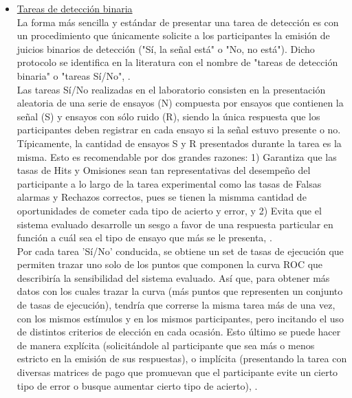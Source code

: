 \begin{itemize}
\item \underline{Tareas de detección binaria}\\

La forma más sencilla y estándar de presentar una tarea de detección es con un procedimiento que únicamente solicite a los participantes la emisión de juicios binarios de detección ("Sí, la señal está" o "No, no está"). Dicho protocolo se identifica en la literatura con el nombre de "tareas de detección binaria" o "tareas Sí/No", \parencite{McNicol2}.\\

Las tareas Sí/No realizadas en el laboratorio consisten en la presentación aleatoria de una serie de ensayos (N) compuesta por ensayos que contienen la señal (S) y ensayos con sólo ruido (R), siendo la única respuesta que los participantes deben registrar en cada ensayo si la señal estuvo presente o no. Típicamente, la cantidad de ensayos S y R presentados durante la tarea es la misma. Esto es recomendable por dos grandes razones: 1) Garantiza que las tasas de Hits y Omisiones sean tan representativas del desempeño del participante a lo largo de la tarea experimental como las tasas de Falsas alarmas y Rechazos correctos, pues se tienen la mismma cantidad de oportunidades de cometer cada tipo de acierto y error, y 2) Evita que el sistema evaluado desarrolle un sesgo a favor de una respuesta particular en función a cuál sea el tipo de ensayo que más se le presenta, \parencite{Wickens}.\\

Por cada tarea 'Sí/No' conducida, se obtiene un set de tasas de ejecución que permiten trazar uno solo de los puntos que componen la curva ROC que describiría la sensibilidad del sistema evaluado. Así que, para obtener más datos con los cuales trazar la curva (más puntos que representen un conjunto de tasas de ejecución), tendría que correrse la misma tarea más de una vez, con los mismos estímulos y en los mismos participantes, pero incitando el uso de distintos criterios de elección en cada ocasión. Esto último se puede hacer de manera explícita (solicitándole al participante que sea más o menos estricto en la emisión de sus respuestas), o implícita (presentando la tarea con diversas matrices de pago que promuevan que el participante evite un cierto tipo de error o busque aumentar cierto tipo de acierto), \parencite{Wickens, McNicol2, Nevin1969}.\\


\end{itemize}
